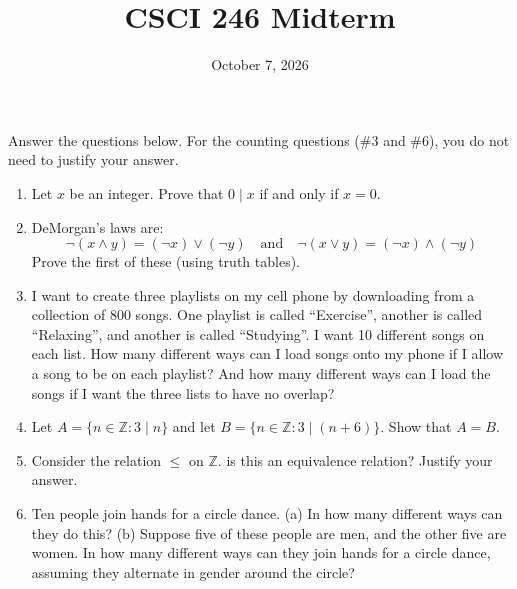 \documentclass[11pt]{article}
\title{CSCI 246 Midterm}
\author{}
\date{October 7, 2026}
\newcommand{\set}[1]{\{ #1 \}}
\begin{document}
\maketitle



Answer the questions below. For the counting questions (\#3 and \#6), you do not need to justify your answer.

\begin{enumerate}
\item Let $x$ be an integer. Prove that $0 \mid x$ if and only if $x=0$.
\item DeMorgan's laws are:
\[ \lnot (x \land y) = (\lnot x) \lor (\lnot y) \quad \text{and} \quad \lnot (x \lor y) = (\lnot x) \land (\lnot y) \]
Prove the first of these (using truth tables). 
\item I want to create three playlists on my cell phone by downloading from a collection of 800 songs. One playlist is called ``Exercise'',  another is called ``Relaxing'', and another is called ``Studying''. I want 10 different songs on each list. How many different ways can I load songs onto my phone if I allow a song to be on each playlist? And how many different ways can I load the songs if I want the three lists to have no overlap?   
\item Let $A = \set{n \in \mathbb{Z} : 3 \mid n}$ and let $B = \set{n \in \mathbb{Z} : 3 \mid (n+6)}$. Show that $A=B$.
\item Consider the relation $\leq$ on $\mathbb{Z}$. is this an equivalence relation? Justify your answer. 
\item Ten people join hands for a circle dance. (a) In how many different ways can they do this? (b) Suppose five of these people are men, and the other five are women. In how many different ways can they join hands for a circle dance, assuming they alternate in gender around the circle?  
\end{enumerate}
\end{document}
